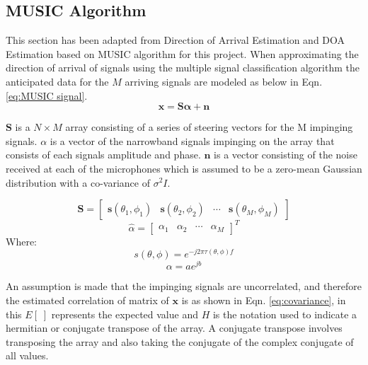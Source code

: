 \documentclass{UoNMCHA}
\numberwithin{equation}{section}
\begin{document}
\subsection{MUSIC Algorithm} \label{sec:Software MUSIC}
    This section has been adapted from Direction of Arrival Estimation \citep{Adv13} and DOA Estimation based on MUSIC algorithm \citep{Tan14} for this project. When approximating the direction of arrival of signals using the multiple signal classification algorithm the anticipated data for the $M$ arriving signals are modeled as below in Eqn. \ref{eq:MUSIC signal}. 
    \begin{equation}
        \mathbf{x}=\mathbf{S\alpha} + \mathbf{n}
        \label{eq:MUSIC signal}
    \end{equation}

    $\mathbf{S}$ is a $N \times M$ array consisting of a series of steering vectors for the M impinging signals. $\alpha$ is a vector of the narrowband signals impinging on the array that consists of each signals amplitude and phase. $\mathbf{n}$ is a vector consisting of the noise received at each of the microphones which is assumed to be a zero-mean Gaussian distribution with a co-variance of $\sigma^2I$.

    \begin{equation}
        \mathbf{S}=
        \begin{bmatrix}
            \mathbf{s}(\theta_1,\phi_1) & \mathbf{s}(\theta_2,\phi_2) & \cdots & \mathbf{s}(\theta_M,\phi_M)
        \end{bmatrix}
    \end{equation}
    \begin{equation}
        \hat{\alpha}=
        \begin{bmatrix}
        \alpha_1 & \alpha_2 & \cdots & \alpha_M
        \end{bmatrix}
        ^T
    \end{equation}
    Where:
    \begin{equation}
        s(\theta,\phi)=e^{-j2\pi \tau(\theta,\phi) f}
    \end{equation}
    \begin{equation}
        \alpha = ae^{jb}
    \end{equation}
    
    An assumption is made that the impinging signals are uncorrelated, and therefore the estimated correlation of matrix of $\mathbf{x}$ is as shown in Eqn. \ref{eq:covariance}, in this $E[\;]$ represents the expected value and $H$ is the notation used to indicate a hermitian or conjugate transpose of the array. A conjugate transpose involves transposing the array and also taking the conjugate of the complex conjugate of all values.
    
\end{document}
